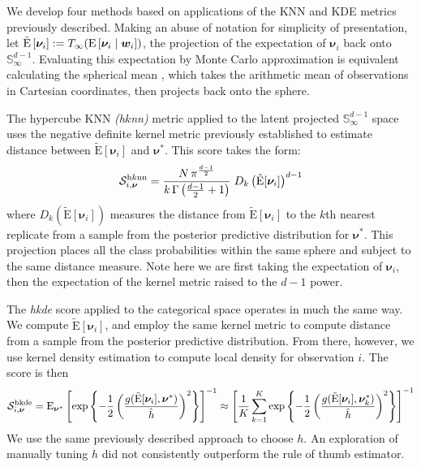     We develop four methods based
    on applications of the KNN and KDE metrics previously described.
    Making an abuse of notation for simplicity of presentation, let 
    $\tilde{\text{E}}\left[\bm{\nu}_i\right] := T_{\infty}(\text{E}\left[\bm{\nu}_i\mid\bm{w}_i\right])$,
    the projection of the expectation of $\bm{\nu}_i$ back onto 
    $\mathbb{S}_{\infty}^{d-1}$.  Evaluating this expectation by
    Monte Carlo approximation is equivalent calculating the spherical mean 
    \citep{mardia1999}, which takes the arithmetic mean of observations in 
    Cartesian coordinates, then projects back onto the sphere.

The hypercube KNN \emph{(h$k$nn)} metric applied to the latent projected 
    $\mathbb{S}_{\infty}^{d-1}$ space uses the negative definite kernel metric 
    previously established to estimate distance between $\tilde{\text{E}}[\bm{\nu}_i]$
    and $\bm{\nu}^*$.  This score takes the form:
    \begin{equation}
      \label{score:cat_hknn}
      \mathcal{S}_{i,\bm{\nu}}^{\text{h$k$nn}} = 
      \frac{N\,\pi^{\frac{d-1}{2}}}{k\,\Gamma\left(\frac{d-1}{2} + 1\right)}
        \;D_{k}\left(\tilde{\text{E}}[\bm{\nu}_i]\right)^{d-1}
    \end{equation}
    where $D_{k}\left(\tilde{\text{E}}[\bm{\nu}_i]\right)$ measures the 
    distance from $\tilde{\text{E}}[\bm{\nu}_i]$ to the $k$th nearest replicate from 
    a sample from the posterior predictive distribution for $\bm{\nu}^*$.  
    This projection places all the class probabilities within the same sphere and 
    subject to the same distance measure.  Note here we are first taking the 
    expectation of $\bm{\nu}_i$, then the expectation of the kernel metric raised 
    to the $d-1$ power.

The \emph{hkde} score applied to the categorical space operates in much the 
    same way.  We compute $\tilde{\text{E}}[\bm{\nu}_i]$, and employ the same 
    kernel metric to compute distance from a sample from the posterior predictive 
    distribution.  From there, however, we use kernel density estimation
    to compute local density for observation $i$.  The score is then
    \begin{equation}
        \label{score:cat_hkde}
        \mathcal{S}_{i,\bm{\nu}}^{\text{hkde}} = \text{E}_{\bm{\nu}^*}\left[
            \exp\left\lbrace
            -\frac{1}{2}\left(
            \frac{g(\tilde{\text{E}}[\bm{\nu}_i], \bm{\nu}^*)}{\hat{h}}
            \right)^2
            \right\rbrace
            \right]^{-1} \approx \left[\frac{1}{K}\sum_{k = 1}^{K}
                \exp\left\lbrace-\frac{1}{2}\left(
                \frac{g(\tilde{\text{E}}[\bm{\nu}_i],\bm{\nu}_k^*)}{\hat{h}}
                \right)^2\right\rbrace\right]^{-1}
    \end{equation}
We use the same previously described approach to choose $h$.  
    An exploration of manually tuning $h$ did not consistently outperform 
    the rule of thumb estimator.

